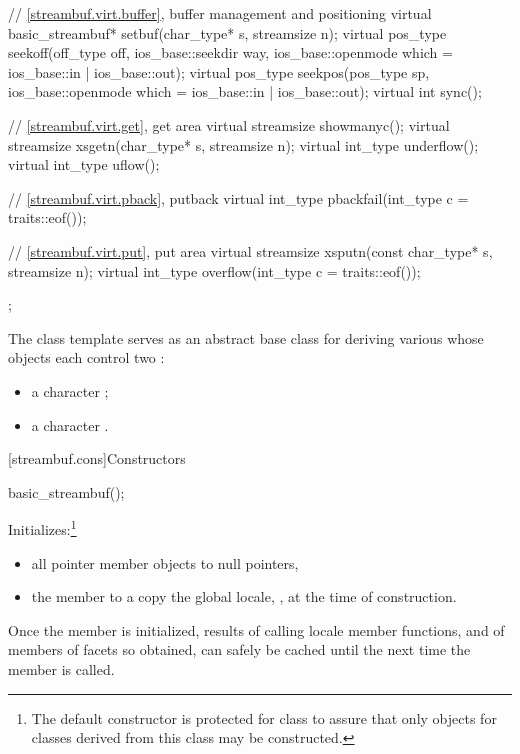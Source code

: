 \begin{codeblock}
{{    // \ref{streambuf.virt.buffer}, buffer management and positioning
    virtual basic_streambuf* setbuf(char_type* s, streamsize n);
    virtual pos_type seekoff(off_type off, ios_base::seekdir way,
                             ios_base::openmode which
                               = ios_base::in | ios_base::out);
    virtual pos_type seekpos(pos_type sp,
                             ios_base::openmode which
                               = ios_base::in | ios_base::out);
    virtual int      sync();

    // \ref{streambuf.virt.get}, get area
    virtual streamsize showmanyc();
    virtual streamsize xsgetn(char_type* s, streamsize n);
    virtual int_type   underflow();
    virtual int_type   uflow();

    // \ref{streambuf.virt.pback}, putback
    virtual int_type   pbackfail(int_type c = traits::eof());

    // \ref{streambuf.virt.put}, put area
    virtual streamsize xsputn(const char_type* s, streamsize n);
    virtual int_type   overflow(int_type c = traits::eof());
  };
}
\end{codeblock}

\pnum
The class template
serves as an abstract base class for deriving various
whose objects each control two
:
\begin{itemize}
\item
a character
;
\item
a character
.
\end{itemize}

[streambuf.cons]{Constructors}

%
\begin{itemdecl}
basic_streambuf();
\end{itemdecl}

\begin{itemdescr}
\pnum
\effects
Initializes:\footnote{The default constructor is protected for class
to assure that only objects for classes
derived from this class may be constructed.}
\begin{itemize}
\item
all pointer member objects to null pointers,
\item
the
member to a copy the global locale,
,
at the time of construction.
\end{itemize}

\pnum
\remarks
Once the
member is initialized, results of calling locale member functions,
and of members of facets so obtained, can safely be cached until the
next time the member
is called.
\end{itemdescr}

